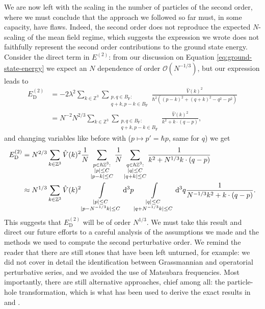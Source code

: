 We are now left with the scaling in the number of particles of the second order, where we must
conclude that the approach we followed so far must, in some capacity, have flaws. Indeed, the
second order does not reproduce the expected $N$-scaling of the mean field regime, which
suggests the expression we wrote does not faithfully represent the second order contributions
to the ground state energy. Consider the direct term in $E^{(2)}$: from our discussion on
Equation \eqref{eq:ground-state-energy} we expect an $N$ dependence of order
$\mathcal{O}(N^{-1/3})$, but our expression leads to
\begin{align*}
	E_{\mathrm{D}}^{(2)}
	&= -2\lambda^2 \sum_{k\in\mathbb{Z}^3} \sum_{\substack{p,q\in B_{\mathrm{F}}:\\q+k,p-k\in B_{\mathrm{F}}}}
	\frac{\hat{V}(k)^2}{\hbar^2((p-k)^2+(q+k)^2-q^2-p^2)}\\
	&= N^{-2}N^{2/3} \sum_{k\in\mathbb{Z}^3} \sum_{\substack{p,q\in B_{\mathrm{F}}:\\q+k,p-k\in B_{\mathrm{F}}}}
	\frac{\hat{V}(k)^2}{k^2+k\cdot(q-p)},
\end{align*}
and changing variables like before with ($p\mapsto p'=\hbar p$, same for $q$) we get
\begin{align*}
	E^{(2)}_{\mathrm{D}}
	&= N^{2/3}\sum_{k\in\mathbb{Z}^3}\hat{V}(k)^2
	\frac{1}{N}\sum_{\substack{p\in\hbar\mathbb{Z}^3:\\|p|\leq C\\|p-k|\leq C}}
	\frac{1}{N}\sum_{\substack{q\in\hbar\mathbb{Z}^3:\\|q|\leq C\\|q+k|\leq C}}
	\frac{1}{k^2+N^{1/3}k\cdot(q-p)}\\
	&\approx N^{1/3}\sum_{k\in\mathbb{Z}^3}\hat{V}(k)^2
	\int\limits_{\substack{|p|\leq C\\|p-N^{-1/3}k|\leq C}}\mathrm{d}^3p
	\int\limits_{\substack{|q|\leq C\\|q+N^{-1/3}k|\leq C}}\mathrm{d}^3q
	\frac{1}{N^{-1/3}k^2+k\cdot(q-p)}.
\end{align*}
This suggests that $E^{(2)}_{\mathrm{D}}$ will be of order $N^{1/3}$. We must take this
result and direct our future efforts to a careful analysis of the assumptions we made and the
methods we used to compute the second perturbative order. We remind the reader that there are
still stones that have been left unturned, for example: we did not cover in detail the
identification between Grassmannian and operatorial perturbative series, and we avoided the
use of Matsubara frequencies. Most importantly, there are still alternative approaches, chief
among all: the particle-hole transformation, which is what has been used to derive the exact
results in \cite{HPRArt} and \cite{BenArt}.

